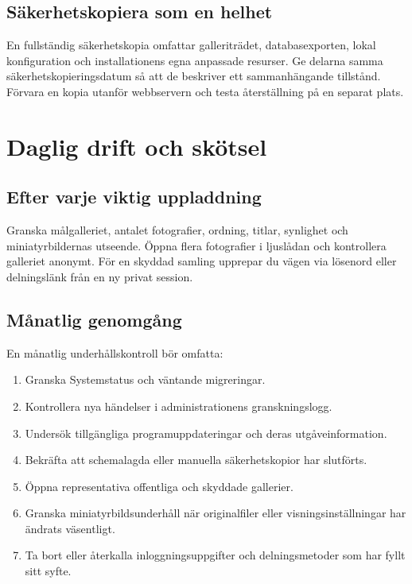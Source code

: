 \documentclass[11pt,a4paper]{article}
\begin{document}
\subsection{Säkerhetskopiera som en helhet}

En fullständig säkerhetskopia omfattar galleriträdet, databasexporten, lokal
konfiguration och installationens egna anpassade resurser. Ge delarna samma
säkerhetskopieringsdatum så att de beskriver ett sammanhängande tillstånd.
Förvara en kopia utanför webbservern och testa återställning på en separat
plats.
\section{Daglig drift och skötsel}
\label{sec:daily-care}

\subsection{Efter varje viktig uppladdning}

Granska målgalleriet, antalet fotografier, ordning, titlar, synlighet och
miniatyrbildernas utseende. Öppna flera fotografier i ljuslådan och kontrollera
galleriet anonymt. För en skyddad samling upprepar du vägen via lösenord eller
delningslänk från en ny privat session.

\subsection{Månatlig genomgång}

En månatlig underhållskontroll bör omfatta:

\begin{enumerate}
  \item Granska Systemstatus och väntande migreringar.
  \item Kontrollera nya händelser i administrationens granskningslogg.
  \item Undersök tillgängliga programuppdateringar och deras utgåveinformation.
  \item Bekräfta att schemalagda eller manuella säkerhetskopior har slutförts.
  \item Öppna representativa offentliga och skyddade gallerier.
  \item Granska miniatyrbildsunderhåll när originalfiler eller
  visningsinställningar har ändrats väsentligt.
  \item Ta bort eller återkalla inloggningsuppgifter och delningsmetoder som har
  fyllt sitt syfte.
\end{enumerate}
\end{document}
